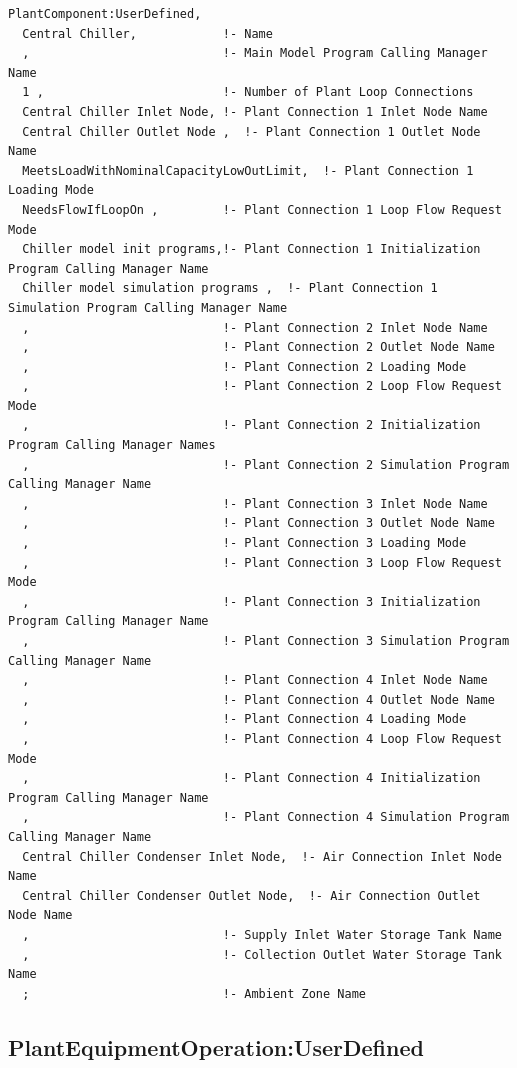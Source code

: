 \begin{lstlisting}
PlantComponent:UserDefined,
  Central Chiller,            !- Name
  ,                           !- Main Model Program Calling Manager Name
  1 ,                         !- Number of Plant Loop Connections
  Central Chiller Inlet Node, !- Plant Connection 1 Inlet Node Name
  Central Chiller Outlet Node ,  !- Plant Connection 1 Outlet Node Name
  MeetsLoadWithNominalCapacityLowOutLimit,  !- Plant Connection 1 Loading Mode
  NeedsFlowIfLoopOn ,         !- Plant Connection 1 Loop Flow Request Mode
  Chiller model init programs,!- Plant Connection 1 Initialization Program Calling Manager Name
  Chiller model simulation programs ,  !- Plant Connection 1 Simulation Program Calling Manager Name
  ,                           !- Plant Connection 2 Inlet Node Name
  ,                           !- Plant Connection 2 Outlet Node Name
  ,                           !- Plant Connection 2 Loading Mode
  ,                           !- Plant Connection 2 Loop Flow Request Mode
  ,                           !- Plant Connection 2 Initialization Program Calling Manager Names
  ,                           !- Plant Connection 2 Simulation Program Calling Manager Name
  ,                           !- Plant Connection 3 Inlet Node Name
  ,                           !- Plant Connection 3 Outlet Node Name
  ,                           !- Plant Connection 3 Loading Mode
  ,                           !- Plant Connection 3 Loop Flow Request Mode
  ,                           !- Plant Connection 3 Initialization Program Calling Manager Name
  ,                           !- Plant Connection 3 Simulation Program Calling Manager Name
  ,                           !- Plant Connection 4 Inlet Node Name
  ,                           !- Plant Connection 4 Outlet Node Name
  ,                           !- Plant Connection 4 Loading Mode
  ,                           !- Plant Connection 4 Loop Flow Request Mode
  ,                           !- Plant Connection 4 Initialization Program Calling Manager Name
  ,                           !- Plant Connection 4 Simulation Program Calling Manager Name
  Central Chiller Condenser Inlet Node,  !- Air Connection Inlet Node Name
  Central Chiller Condenser Outlet Node,  !- Air Connection Outlet Node Name
  ,                           !- Supply Inlet Water Storage Tank Name
  ,                           !- Collection Outlet Water Storage Tank Name
  ;                           !- Ambient Zone Name
\end{lstlisting}

\subsection{PlantEquipmentOperation:UserDefined}\label{plantequipmentoperationuserdefined}

